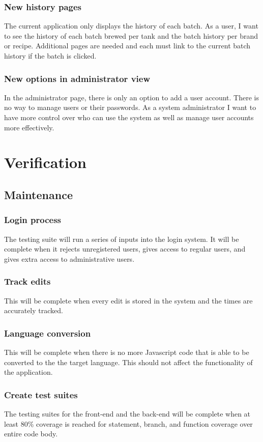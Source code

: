 \documentclass[draftclsnofoot,onecolumn,journal,letterpaper,compsoc,10pt]{IEEEtran}
\begin{document}
        \subsubsection{New history pages}
        The current application only displays the history of each batch. As a user, I want to see the history of each batch brewed per tank and the batch history per brand or recipe. Additional pages are needed and each must link to the current batch history if the batch is clicked.  
        \subsubsection{New options in administrator view}
        In the administrator page, there is only an option to add a user account. There is no way to manage users or their passwords. As a system administrator I want to have more control over who can use the system as well as manage user accounts more effectively. 

\section{Verification}
    \subsection{Maintenance}
        \subsubsection{Login process}
            The testing suite will run a series of inputs into the login system. It will be complete when it rejects unregistered users, gives access to regular users, and gives extra access to administrative users.
        \subsubsection{Track edits}
            This will be complete when every edit is stored in the system and the times are accurately tracked.
        \subsubsection{Language conversion}
            This will be complete when there is no more Javascript code that is able to be converted to the the target language. This should not affect the functionality of the application.
        \subsubsection{Create test suites}
            The testing suites for the front-end and the back-end will be complete when at least 80\% coverage is reached for statement, branch, and function coverage over entire code body.
\end{document}

